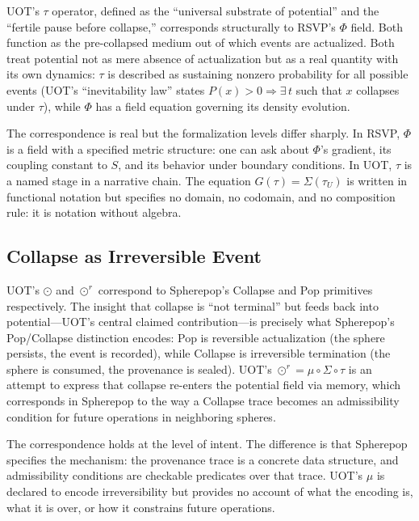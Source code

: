 \documentclass[12pt, oneside]{article}
\theoremstyle{plain-remark}
\newcommand{\utau}{\tau}
\newcommand{\uSigma}{\Sigma}
\newcommand{\umu}{\mu}
\newcommand{\ucollapse}{\odot}
\newcommand{\urcollapse}{\odot^r}
\newcommand{\Phif}{\Phi}
\newcommand{\Sf}{S}
\begin{document}
UOT's $\utau$ operator, defined as the ``universal substrate of potential'' and the
``fertile pause before collapse,'' corresponds structurally to RSVP's $\Phif$ field.
Both function as the pre-collapsed medium out of which events are actualized. Both
treat potential not as mere absence of actualization but as a real quantity with its own
dynamics: $\utau$ is described as sustaining nonzero probability for all possible events
(UOT's ``inevitability law'' states $P(x) > 0 \Rightarrow \exists\, t$ such that $x$
collapses under $\utau$), while $\Phif$ has a field equation governing its density
evolution.

The correspondence is real but the formalization levels differ sharply. In RSVP,
$\Phif$ is a field with a specified metric structure: one can ask about $\Phif$'s gradient,
its coupling constant to $\Sf$, and its behavior under boundary conditions. In UOT,
$\utau$ is a named stage in a narrative chain. The equation $G(\utau) = \uSigma(\utau_U)$
is written in functional notation but specifies no domain, no codomain, and no composition
rule: it is notation without algebra.

\subsection{Collapse as Irreversible Event}

UOT's $\ucollapse$ and $\urcollapse$ correspond to Spherepop's Collapse and Pop
primitives respectively. The insight that collapse is ``not terminal'' but feeds back
into potential---UOT's central claimed contribution---is precisely what Spherepop's
Pop/Collapse distinction encodes: Pop is reversible actualization (the sphere persists,
the event is recorded), while Collapse is irreversible termination (the sphere is
consumed, the provenance is sealed). UOT's $\urcollapse = \umu \circ \uSigma \circ \utau$
is an attempt to express that collapse re-enters the potential field via memory, which
corresponds in Spherepop to the way a Collapse trace becomes an admissibility condition
for future operations in neighboring spheres.

The correspondence holds at the level of intent. The difference is that Spherepop
specifies the mechanism: the provenance trace is a concrete data structure, and admissibility
conditions are checkable predicates over that trace. UOT's $\umu$ is declared to encode
irreversibility but provides no account of what the encoding is, what it is over, or how
it constrains future operations.
\end{document}
